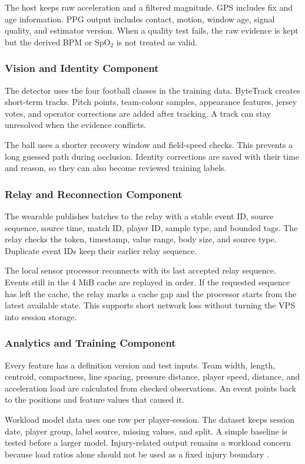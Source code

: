 The host keeps raw acceleration and a filtered magnitude. GPS includes fix and
age information. PPG output includes contact, motion, window age, signal
quality, and estimator version. When a quality test fails, the raw evidence is
kept but the derived BPM or SpO$_2$ is not treated as valid.

\subsubsection{Vision and Identity Component}
The detector uses the four football classes in the training data. ByteTrack
creates short-term tracks. Pitch points, team-colour samples, appearance
features, jersey votes, and operator corrections are added after tracking. A
track can stay unresolved when the evidence conflicts.

The ball uses a shorter recovery window and field-speed checks. This prevents a
long guessed path during occlusion. Identity corrections are saved with their
time and reason, so they can also become reviewed training labels.

\subsubsection{Relay and Reconnection Component}
The wearable publishes batches to the relay with a stable event ID, source
sequence, source time, match ID, player ID, sample type, and bounded tags. The
relay checks the token, timestamp, value range, body size, and source type.
Duplicate event IDs keep their earlier relay sequence.

The local sensor processor reconnects with its last accepted relay sequence.
Events still in the 4 MiB cache are replayed in order. If the requested sequence
has left the cache, the relay marks a cache gap and the processor starts from
the latest available state. This supports short network loss without turning
the VPS into session storage.

\subsubsection{Analytics and Training Component}
Every feature has a definition version and test inputs. Team width, length,
centroid, compactness, line spacing, pressure distance, player speed, distance,
and acceleration load are calculated from checked observations. An event points
back to the positions and feature values that caused it.

Workload model data uses one row per player-session. The dataset keeps session
date, player group, label source, missing values, and split. A simple baseline is
tested before a larger model. Injury-related output remains a workload concern
because load ratios alone should not be used as a fixed injury boundary
\cite{bowen2020acwr,dalen2021acwr}.


